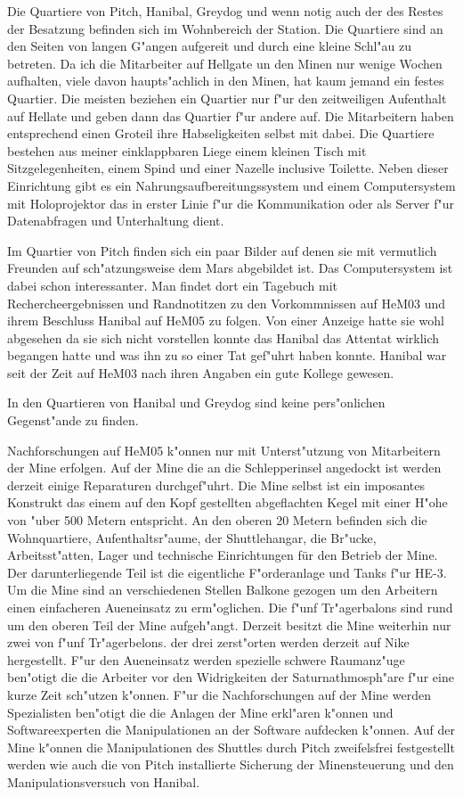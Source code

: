 Die Quartiere von Pitch, Hanibal, Greydog und wenn notig auch der des Restes der Besatzung befinden sich im Wohnbereich der Station. Die Quartiere sind an den Seiten von langen G"angen aufgereit und durch eine kleine Schl"au\3 zu betreten. Da ich die Mitarbeiter auf Hellgate un den Minen nur wenige Wochen aufhalten, viele davon haupts"achlich in den Minen, hat kaum jemand ein festes Quartier. Die meisten beziehen ein Quartier nur f"ur den zeitweiligen Aufenthalt auf Hellate und geben dann das Quartier f"ur andere auf. Die Mitarbeitern haben entsprechend einen Gro\3teil ihre Habseligkeiten selbst mit dabei. Die Quartiere bestehen aus meiner einklappbaren Liege einem kleinen Tisch mit Sitzgelegenheiten, einem Spind und einer Na\3zelle inclusive Toilette. Neben dieser Einrichtung gibt es ein Nahrungsaufbereitungssystem und einem Computersystem mit Holoprojektor das in erster Linie f"ur die Kommunikation oder als Server f"ur Datenabfragen und Unterhaltung dient.

Im Quartier von Pitch finden sich ein paar Bilder auf denen sie mit vermutlich Freunden auf sch"atzungsweise dem Mars abgebildet ist. Das Computersystem ist dabei schon interessanter. Man findet dort ein Tagebuch mit Rechercheergebnissen und Randnotitzen zu den Vorkommnissen auf HeM03 und ihrem Beschluss Hanibal auf HeM05 zu folgen. Von einer Anzeige hatte sie wohl abgesehen da sie sich nicht vorstellen konnte das Hanibal das Attentat wirklich begangen hatte und was ihn zu so einer Tat gef"uhrt haben konnte. Hanibal war seit der Zeit auf HeM03 nach ihren Angaben ein gute Kollege gewesen.

In den Quartieren von Hanibal und Greydog sind keine pers"onlichen Gegenst"ande zu finden.

Nachforschungen auf HeM05 k"onnen nur mit Unterst"utzung von Mitarbeitern der Mine erfolgen. Auf der Mine die an die Schlepperinsel angedockt ist werden derzeit einige Reparaturen durchgef"uhrt. Die Mine selbst ist ein imposantes Konstrukt das einem auf den Kopf gestellten abgeflachten Kegel mit einer H"ohe von "uber 500 Metern entspricht. An den oberen 20 Metern befinden sich die Wohnquartiere, Aufenthaltsr"aume, der Shuttlehangar, die Br"ucke, Arbeitsst"atten, Lager und technische Einrichtungen für den Betrieb der Mine. Der darunterliegende Teil ist die eigentliche F"orderanlage und Tanks f"ur HE-3. Um die Mine sind an verschiedenen Stellen Balkone gezogen um den Arbeitern einen einfacheren Au\3eneinsatz zu erm"oglichen. Die f"unf Tr"agerbalons sind rund um den oberen Teil der Mine aufgeh"angt. 
Derzeit besitzt die Mine weiterhin nur zwei von f"unf Tr"agerbelons. der drei zerst"orten werden derzeit auf Nike hergestellt. F"ur den Au\3eneinsatz werden spezielle schwere Raumanz"uge ben"otigt die die Arbeiter vor den Widrigkeiten der Saturnathmosph"are f"ur eine kurze Zeit sch"utzen k"onnen. F"ur die Nachforschungen auf der Mine werden Spezialisten ben"otigt die die Anlagen der Mine erkl"aren k"onnen und Softwareexperten die Manipulationen an der Software aufdecken k"onnen. Auf der Mine k"onnen die Manipulationen des Shuttles durch Pitch zweifelsfrei festgestellt werden wie auch die von Pitch installierte Sicherung der Minensteuerung und den Manipulationsversuch von Hanibal.

